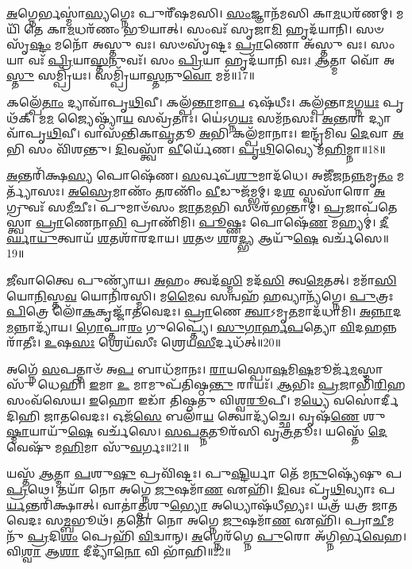 \-\ul{𑌅}\-𑌗𑍍𑌨𑍇𑌰𑍍𑌭𑌸𑍍𑌮𑌾॑\-\ul{𑌸𑍍𑌯}\-𑌗𑍍𑌨𑍇𑌃 𑌪𑍁𑌰𑍀᳴𑌷𑌮𑌸𑌿।
\-\ul{𑌸𑌂}\-𑌜𑍍𑌞𑌾𑌨᳴𑌮𑌸𑌿 𑌕𑌾\-\ul{𑌮}\-𑌧𑌰᳴𑌣𑌮𑍍।
𑌮𑌯𑌿᳴ 𑌤𑍇 𑌕𑌾\-\ul{𑌮}\-𑌧𑌰᳴𑌣𑌂 𑌭𑍂𑌯𑌾𑌤𑍍।
𑌸𑌂𑌵𑌃᳴ 𑌸𑍃𑌜𑌾\-\ul{𑌮𑌿} 𑌹𑍃𑌦᳴𑌯𑌾𑌨𑌿।
𑌸𑍞𑌸𑍃᳴\-\ul{𑌷𑍍𑌟𑌂} 𑌮𑌨𑍋᳴ 𑌅𑌸𑍍𑌤𑍁 𑌵𑌃।
𑌸𑍞𑌸𑍃᳴𑌷𑍍𑌟𑌃 \ul{𑌪𑍍𑌰𑌾}\-𑌣𑍋 𑌅᳴𑌸𑍍𑌤𑍁 𑌵𑌃।
𑌸𑌂 𑌯𑌾 𑌵𑌃᳴ \ul{𑌪𑍍𑌰𑌿}\-𑌯𑌾\-\ul{𑌸𑍍𑌤}\-𑌨𑍁𑌵𑌃᳴।
𑌸𑌂 \ul{𑌪𑍍𑌰𑌿}\-𑌯𑌾 𑌹𑍃𑌦᳴𑌯𑌾𑌨𑌿 𑌵𑌃।
\-\ul{𑌆}\-𑌤𑍍𑌮𑌾 𑌵𑍋᳴ 𑌅\-\ul{𑌸𑍍𑌤𑍁} 𑌸𑌮𑍍𑌪𑍍𑌰𑌿᳴𑌯𑌃।
𑌸𑌮𑍍𑌪𑍍𑌰𑌿᳴𑌯𑌾\-\ul{𑌸𑍍𑌤}\-𑌨𑍁\-\ul{𑌵𑍋} 𑌮𑌮᳴॥17॥

𑌕𑌲𑍍𑌪𑍇᳴\-\ul{𑌤𑌾𑌂} 𑌦𑍍𑌯𑌾𑌵𑌾᳴𑌪𑍃\-\ul{𑌥𑌿}\-𑌵𑍀।
𑌕𑌲𑍍𑌪᳴\-\ul{𑌨𑍍𑌤𑌾}\-𑌮𑌾\-\ul{𑌪} 𑌓𑌷᳴𑌧𑍀𑌃।
𑌕𑌲𑍍𑌪᳴𑌨𑍍𑌤𑌾\-\ul{𑌮}\-𑌗𑍍𑌨\-\ul{𑌯𑌃} 𑌪𑍃𑌥᳴𑌕𑍍।
𑌮\-\ul{𑌮} 𑌜𑍍𑌯𑍈𑌷𑍍𑌠𑍍𑌯𑌾᳴\-\ul{𑌯} 𑌸𑌵𑍍𑌰᳴𑌤𑌾𑌃।
𑌯𑍇॑𑌽𑌗𑍍𑌨\-\ul{𑌯𑌃} 𑌸𑌮᳴𑌨𑌸𑌃।
\-\ul{𑌅}\-\-\ul{𑌨𑍍𑌤}\-𑌰𑌾 𑌦𑍍𑌯𑌾𑌵𑌾᳴𑌪𑍃\-\ul{𑌥𑌿}\-𑌵𑍀।
𑌵𑌾𑌸᳴𑌨𑍍𑌤𑌿𑌕𑌾\-\ul{𑌵𑍃}\-𑌤𑍂 \ul{𑌅}\-𑌭𑌿 𑌕𑌲𑍍𑌪᳴𑌮𑌾𑌨𑌾𑌃।
𑌇𑌨𑍍𑌦𑍍𑌰᳴𑌮𑌿𑌵 \ul{𑌦𑍇}\-𑌵𑌾 \ul{𑌅}\-𑌭𑌿 𑌸𑌂 𑌵𑌿᳴𑌶𑌨𑍍𑌤𑍁।
\-\ul{𑌦𑌿}\-𑌵𑌸𑍍𑌤𑍍𑌵𑌾᳴ \ul{𑌵𑍀}\-𑌰𑍍𑌯𑍇᳴𑌣।
\-\ul{𑌪𑍃}\-\-\ul{𑌥𑌿}\-𑌵𑍍𑌯𑍈 𑌮᳴\-\ul{𑌹𑌿}\-𑌮𑍍𑌨𑌾॥18॥

\-\ul{𑌅}\-𑌨𑍍𑌤𑌰𑌿᳴𑌕𑍍𑌷\-\ul{𑌸𑍍𑌯} 𑌪𑍋𑌷𑍇᳴𑌣।
\-\ul{𑌸}\-𑌰𑍍𑌵𑌪᳴\-\ul{𑌶𑍁}\-𑌮𑌾𑌦᳴𑌧𑍇।
𑌅𑌜𑍀᳴𑌜𑌨\-\ul{𑌨𑍍𑌨}\-𑌮𑍃\-\ul{𑌤𑌂} 𑌮𑌰𑍍𑌤𑍍𑌯𑌾᳴𑌸𑌃।
\-\ul{𑌅}\-\-\ul{𑌸𑍍𑌰𑍇}\-𑌮𑌾𑌣𑌂᳴ \ul{𑌤}\-𑌰𑌣𑌿𑌂᳴ \ul{𑌵𑍀}\-𑌡𑍁𑌜᳴𑌮𑍍𑌭𑌮𑍍।
𑌦\-\ul{𑌶} 𑌸𑍍𑌵𑌸𑌾᳴𑌰𑍋 \ul{𑌅}\-𑌗𑍍𑌰𑍁𑌵𑌃᳴ 𑌸\-\ul{𑌮𑍀}\-𑌚𑍀𑌃।
𑌪𑍁𑌮𑌾𑍞᳴𑌸𑌂 \ul{𑌜𑌾}\-𑌤\-\ul{𑌮}\-𑌭𑌿 𑌸𑍞𑌰᳴𑌭𑌨𑍍𑌤𑌾𑌮𑍍।
\-\ul{𑌪𑍍𑌰}\-𑌜𑌾𑌪᳴𑌤𑍇𑌸𑍍𑌤𑍍𑌵𑌾 \ul{𑌪𑍍𑌰𑌾}\-𑌣𑍇𑌨𑌾\-\ul{𑌭𑌿} 𑌪𑍍𑌰𑌾𑌣𑌿᳴𑌮𑌿।
\-\ul{𑌪𑍂}\-𑌷𑍍𑌣𑌃 𑌪𑍋𑌷𑍇᳴\-\ul{𑌣} 𑌮𑌹𑍍𑌯𑌮𑍍॑।
\-\ul{𑌦𑍀}\-\-\ul{𑌰𑍍𑌘𑌾}\-\-\ul{𑌯𑍁}\-𑌤𑍍𑌵𑌾𑌯᳴ \ul{𑌶}\-𑌤𑌶𑌾᳴𑌰𑌦𑌾𑌯।
\-\ul{𑌶}\-𑌤𑍞 \ul{𑌶}\-𑌰\-\ul{𑌦𑍍𑌭𑍍𑌯} 𑌆𑌯𑍁᳴\-\ul{𑌷𑍇} 𑌵𑌰𑍍𑌚᳴𑌸𑍇॥19॥

\-\ul{𑌜𑍀}\-𑌵𑌾𑌤𑍍𑌵𑍈 𑌪𑍁𑌣𑍍𑌯𑌾᳴𑌯।
\-\ul{𑌅}\-𑌹𑌂 𑌤𑍍𑌵𑌦᳴\-\ul{𑌸𑍍𑌮𑌿} 𑌮𑌦᳴\-\ul{𑌸𑌿} 𑌤𑍍𑌵\-\ul{𑌮𑍇}\-𑌤𑌤𑍍।
𑌮𑌮𑌾᳴\-\ul{𑌸𑌿} 𑌯𑍋\-\ul{𑌨𑌿}\-𑌸𑍍𑌤\-\ul{𑌵} 𑌯𑍋𑌨𑌿᳴𑌰𑌸𑍍𑌮𑌿।
𑌮\-\ul{𑌮𑍈}\-𑌵 𑌸𑌨𑍍𑌵𑌹᳴ \ul{𑌹}\-𑌵𑍍𑌯𑌾𑌨𑍍𑌯᳴𑌗𑍍𑌨𑍇।
\-\ul{𑌪𑍁}\-𑌤𑍍𑌰𑌃 \ul{𑌪𑌿}\-𑌤𑍍𑌰𑍇 𑌲𑍋᳴\-\ul{𑌕}\-𑌕𑍃𑌜𑍍𑌜𑌾᳴𑌤𑌵𑍇𑌦𑌃।
\-\ul{𑌪𑍍𑌰𑌾}\-𑌣𑍇 \ul{𑌤𑍍𑌵𑌾}\-\-𑌽𑌮𑍃\-\ul{𑌤}\-𑌮𑌾𑌦᳴𑌧𑌾𑌮𑌿।
\-\ul{𑌅}\-\-\ul{𑌨𑍍𑌨𑌾}\-𑌦\-\ul{𑌮}\-𑌨𑍍𑌨𑌾𑌦𑍍𑌯𑌾᳴𑌯।
\-\ul{𑌗𑍋}\-𑌪𑍍𑌤𑌾\-\ul{𑌰𑌂} 𑌗𑍁𑌪𑍍𑌤𑍍𑌯𑍈॑।
\-\ul{𑌸𑍁}\-\-\ul{𑌗𑌾}\-\-\ul{𑌰𑍍}\-\-\ul{𑌹}\-\-\ul{𑌪}\-𑌤𑍍𑌯𑍋 \ul{𑌵𑌿}\-𑌦\-\ul{𑌹}\-𑌨𑍍𑌨𑌰𑌾᳴𑌤𑍀𑌃।
\-\ul{𑌉}\-𑌷\-\ul{𑌸𑌃} 𑌶𑍍𑌰𑍇𑌯᳴𑌸𑍀𑌃 𑌶𑍍𑌰𑍇𑌯\-\ul{𑌸𑍀}\-𑌰𑍍𑌦𑌧᳴𑌤𑍍॥20॥

𑌅𑌗𑍍𑌨𑍇᳴ \ul{𑌸}\-𑌪𑌤𑍍𑌨𑌾𑍞᳴ 𑌅\-\ul{𑌪} 𑌬𑌾𑌧᳴𑌮𑌾𑌨𑌃।
\-\ul{𑌰𑌾}\-𑌯𑌸𑍍𑌪𑍋\-\ul{𑌷}\-𑌮𑌿\-\ul{𑌷}\-𑌮𑍂𑌰𑍍𑌜᳴\-\ul{𑌮}\-𑌸𑍍𑌮𑌾𑌸𑍁᳴ 𑌧𑍇𑌹𑌿।
\-\ul{𑌇}\-𑌮𑌾 \ul{𑌉} 𑌮𑌾𑌮𑍁𑌪᳴𑌤𑌿𑌷𑍍𑌠\-\ul{𑌨𑍍𑌤𑍁} 𑌰𑌾𑌯𑌃᳴।
\-\ul{𑌆}\-𑌭𑌿𑌃 \ul{𑌪𑍍𑌰}\-𑌜𑌾𑌭𑌿᳴\-\ul{𑌰𑌿}\-𑌹 𑌸𑌂𑌵᳴𑌸𑍇𑌯।
\-\ul{𑌇}\-𑌹𑍋 𑌇𑌡𑌾᳴ 𑌤𑌿𑌷𑍍𑌠𑌤𑍁 𑌵𑌿𑌶𑍍𑌵\-\ul{𑌰𑍂}\-𑌪𑍀।
𑌮\-\ul{𑌧𑍍𑌯𑍇} 𑌵𑌸𑍋॑𑌰𑍍𑌦𑍀𑌦𑌿𑌹𑌿 𑌜𑌾𑌤𑌵𑍇𑌦𑌃।
𑌓𑌜᳴\-\ul{𑌸𑍇} 𑌬𑌲𑌾᳴\-\ul{𑌯} 𑌤𑍍𑌵𑍋𑌦𑍍𑌯᳴𑌚𑍍𑌛𑍇।
𑌵𑍃𑌷᳴\-\ul{𑌣𑍇} 𑌶𑍁\-\ul{𑌷𑍍𑌮𑌾}\-𑌯𑌾𑌯𑍁᳴\-\ul{𑌷𑍇} 𑌵𑌰𑍍𑌚᳴𑌸𑍇।
\-\ul{𑌸}\-\-\ul{𑌪}\-\-\ul{𑌤𑍍𑌨}\-𑌤𑍂𑌰᳴𑌸𑌿 𑌵𑍃\-\ul{𑌤𑍍𑌰}\-𑌤𑍂𑌃।
𑌯𑌸𑍍𑌤𑍇᳴ \ul{𑌦𑍇}\-𑌵𑍇𑌷𑍁᳴ 𑌮\-\ul{𑌹𑌿}\-𑌮𑌾 𑌸𑍁᳴\-\ul{𑌵}\-𑌰𑍍𑌗𑌃॥21॥

𑌯𑌸𑍍𑌤᳴ \ul{𑌆}\-𑌤𑍍𑌮𑌾 \ul{𑌪}\-𑌶𑍁\-\ul{𑌷𑍁} 𑌪𑍍𑌰𑌵𑌿᳴𑌷𑍍𑌟𑌃।
𑌪𑍁\-\ul{𑌷𑍍𑌟𑌿}\-𑌰𑍍𑌯𑌾 𑌤𑍇᳴ 𑌮\-\ul{𑌨𑍁}\-𑌷𑍍𑌯𑍇᳴𑌷𑍁 𑌪\-\ul{𑌪𑍍𑌰}\-𑌥𑍇।
𑌤𑌯𑌾᳴ 𑌨𑍋 𑌅𑌗𑍍𑌨𑍇 \ul{𑌜𑍁}\-𑌷𑌮𑌾᳴\-\ul{𑌣} 𑌏𑌹𑌿᳴।
\-\ul{𑌦𑌿}\-𑌵𑌃 𑌪𑍃᳴\-\ul{𑌥𑌿}\-𑌵𑍍𑌯𑌾𑌃 𑌪\-\ul{𑌰𑍍𑌯}\-𑌨𑍍𑌤𑌰𑌿᳴𑌕𑍍𑌷𑌾𑌤𑍍।
𑌵𑌾𑌤𑌾॑\-\ul{𑌤𑍍𑌪}\-𑌶𑍁\-\ul{𑌭𑍍𑌯𑍋} 𑌅𑌧𑍍𑌯𑍋𑌷᳴𑌧𑍀𑌭𑍍𑌯𑌃।
𑌯𑌤𑍍𑌰᳴ 𑌯𑌤𑍍𑌰 𑌜𑌾𑌤𑌵𑍇𑌦𑌃 𑌸\-\ul{𑌮𑍍𑌬}\-𑌭𑍂𑌥᳴।
𑌤𑌤𑍋᳴ 𑌨𑍋 𑌅𑌗𑍍𑌨𑍇 \ul{𑌜𑍁}\-𑌷𑌮𑌾᳴\-\ul{𑌣} 𑌏𑌹𑌿᳴।
𑌪𑍍𑌰𑌾\-\ul{𑌚𑍀}\-𑌮𑌨𑍁᳴ \ul{𑌪𑍍𑌰}\-𑌦𑌿\-\ul{𑌶𑌂} 𑌪𑍍𑌰𑍇𑌹𑌿᳴ \ul{𑌵𑌿}\-𑌦𑍍𑌵𑌾𑌨𑍍।
\-\ul{𑌅}\-𑌗𑍍𑌨𑍇𑌰᳴𑌗𑍍𑌨𑍇 \ul{𑌪𑍁}\-𑌰𑍋 𑌅᳴𑌗𑍍𑌨𑌿𑌰𑍍𑌭\-\ul{𑌵𑍇}\-𑌹।
𑌵𑌿\-\ul{𑌶𑍍𑌵𑌾} 𑌆\-\ul{𑌶𑌾} 𑌦𑍀𑌦𑍍𑌯𑌾᳴\-\ul{𑌨𑍋} 𑌵𑌿 𑌭𑌾᳴𑌹𑌿॥22॥

